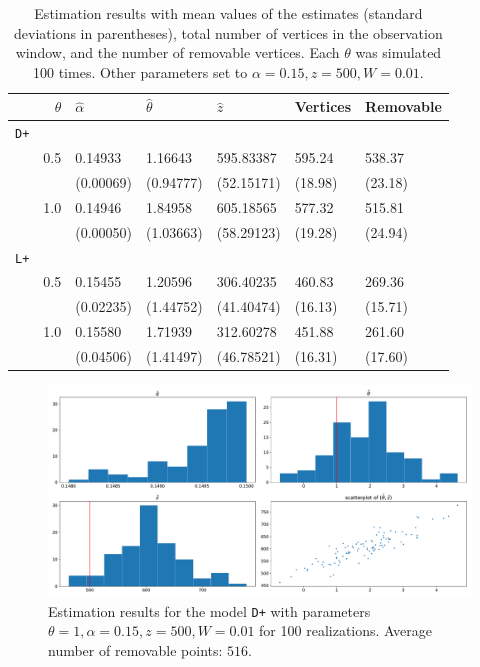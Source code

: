 \begin{table}\centering
{}
\begin{tabular}{lrlllll}\toprule
& $\theta$ & $\hat\alpha$  &  $\hat\theta$ & $\hat z$ & Vertices & Removable  \\
\midrule
\texttt{D+} \\
 & 0.5 &  0.14933 &  1.16643 &  595.83387 &  595.24 &  538.37 \\
 &  &  (0.00069) &  (0.94777) &  (52.15171) &  (18.98) &  (23.18) \\
 & 1.0 &  0.14946 &  1.84958 &  605.18565 &  577.32 &  515.81 \\
 &  &  (0.00050) &  (1.03663) &  (58.29123) &  (19.28) &  (24.94) \\
\texttt{L+} \\
 & 0.5 &  0.15455 &  1.20596 &  306.40235 &  460.83 &  269.36 \\
 &  &  (0.02235) &  (1.44752) &  (41.40474) &  (16.13) &  (15.71) \\
 & 1.0 &  0.15580 &  1.71939 &  312.60278 &  451.88 &  261.60 \\
 &  &  (0.04506) &  (1.41497) &  (46.78521) &  (16.31) &  (17.60) \\
\bottomrule
\end{tabular}
\caption{Estimation results with mean values of the estimates (standard deviations in parentheses), total number of vertices in the observation window, and the number of removable vertices. Each $\theta$ was simulated 100 times. Other parameters set to $\alpha = 0.15, z=500, W=0.01$. }
\label{tab:estsummary}
\end{table} 








\begin{figure}
  \centering
  \includegraphics[width=1\textwidth]{"../img/numeric/estimation - type_D+_theta_1"}
  \caption{Estimation results for the model \texttt{D+} with parameters $\theta=1,\alpha=0.15,z=500,W=0.01$ for 100 realizations. Average number of removable points: $516$.}
  \label{fig:estD1}
\end{figure}



